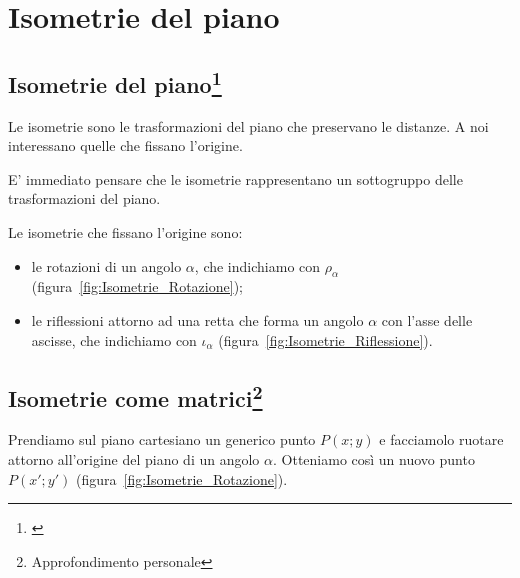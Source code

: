 \chapter{Isometrie del piano}
\label{cpt:Isometrie}

\section[Isometrie del piano]{Isometrie del piano\footnote{\cite[7 novembre 2021]{lucchini}}}
Le isometrie sono le trasformazioni del piano che preservano le distanze. A noi interessano quelle che fissano l'origine.

E' immediato pensare che le isometrie rappresentano un sottogruppo delle trasformazioni del piano.

Le isometrie che fissano l'origine sono:

\begin{itemize}
	\item le rotazioni di un angolo $\alpha$, che indichiamo con $\rho_\alpha$ (figura~\ref{fig:Isometrie_Rotazione});
	\item le riflessioni attorno ad una retta che forma un angolo $\alpha$ con l'asse delle ascisse, che indichiamo con $\iota_\alpha$ (figura~\ref{fig:Isometrie_Riflessione}).
\end{itemize}

\section[Isometrie come matrici]{Isometrie come matrici\footnote{Approfondimento personale}}

Prendiamo sul piano cartesiano un generico punto $P(x; y)$ e facciamolo ruotare attorno all'origine del piano di un angolo $\alpha$. Otteniamo così un nuovo punto $P(x'; y')$ (figura~\ref{fig:Isometrie_Rotazione}).

